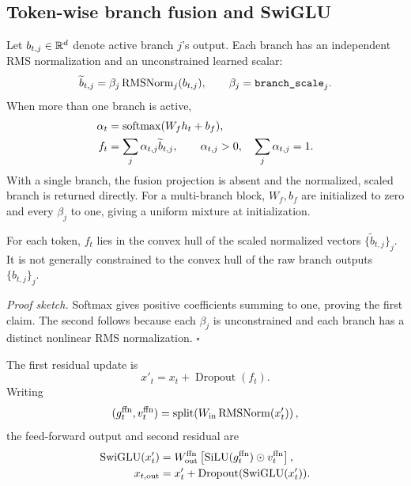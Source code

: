 \subsection{Token-wise branch fusion and SwiGLU}
\label{subsec:fusion}

Let \(b_{t,j}\in\mathbb{R}^d\) denote active branch \(j\)'s output.  Each branch has an
independent RMS normalization and an unconstrained learned scalar:
\begin{equation}
  \widetilde b_{t,j}
  =
  \beta_j\operatorname{RMSNorm}_j(b_{t,j}),
  \qquad
  \beta_j=\texttt{branch\_scale}_j.
  \label{eq:branch-normalization}
\end{equation}
When more than one branch is active,
\begin{align}
  \alpha_t
    &=\operatorname{softmax}(W_fh_t+b_f), \\
  f_t
    &=\sum_j\alpha_{t,j}\widetilde b_{t,j},
  \qquad
  \alpha_{t,j}>0,\quad
  \sum_j\alpha_{t,j}=1.
  \label{eq:convex-fusion}
\end{align}
With a single branch, the fusion projection is absent and the normalized,
scaled branch is returned directly.  For a multi-branch block, \(W_f,b_f\)
are initialized to zero and every \(\beta_j\) to one, giving a uniform mixture
at initialization.

\begin{proposition}
\label{prop:fusion-convexity}
For each token, \(f_t\) lies in the convex hull of the scaled normalized
vectors \(\{\widetilde b_{t,j}\}_j\).  It is not generally constrained to the
convex hull of the raw branch outputs \(\{b_{t,j}\}_j\).
\end{proposition}
\noindent\emph{Proof sketch.}
Softmax gives positive coefficients summing to one, proving the first claim.
The second follows because each \(\beta_j\) is unconstrained and each branch
has a distinct nonlinear RMS normalization. \hfill\(\square\)

The first residual update is
\begin{equation}
  x'_t
  =
  x_t+\operatorname{Dropout}(f_t).
\end{equation}
Writing
\begin{equation}
  (g_t^{\mathrm{ffn}},v_t^{\mathrm{ffn}})
  =
  \operatorname{split}\!\left(
    W_{\mathrm{in}}\operatorname{RMSNorm}(x'_t)
  \right),
\end{equation}
the feed-forward output and second residual are
\begin{align}
  \operatorname{SwiGLU}(x'_t)
    &=
    W_{\mathrm{out}}^{\mathrm{ffn}}
    \left[
      \operatorname{SiLU}(g_t^{\mathrm{ffn}})
      \odot v_t^{\mathrm{ffn}}
    \right], \\
  x_{t,\mathrm{out}}
    &=
    x'_t+
    \operatorname{Dropout}(
      \operatorname{SwiGLU}(x'_t)
    ).
  \label{eq:block-output}
\end{align}

